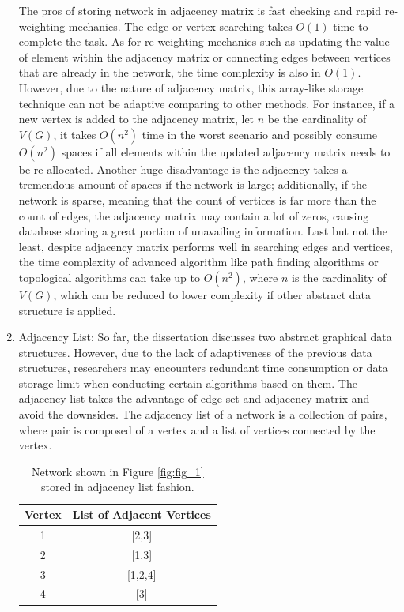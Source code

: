 \documentclass[12pt]{article}
\begin{document}
\begin{enumerate}[label=(\roman*)]
\bigbreak

The pros of storing network in adjacency matrix is fast checking and rapid re-weighting mechanics. The edge or vertex searching takes $O(1)$ time to complete the task. As for re-weighting mechanics such as updating the value of element within the adjacency matrix or connecting edges between vertices that are already in the network, the time complexity is also in $O(1)$. However, due to the nature of adjacency matrix, this array-like storage technique can not be adaptive comparing to other methods. For instance, if a new vertex is added to the adjacency matrix, let $n$ be the cardinality of $V(G)$, it takes $O(n^2)$ time in the worst scenario and possibly consume $O(n^2)$ spaces if all elements within the updated adjacency matrix needs to be re-allocated. Another huge disadvantage is the adjacency takes a tremendous amount of spaces if the network is large; additionally, if the network is sparse, meaning that the count of vertices is far more than the count of edges, the adjacency matrix may contain a lot of zeros, causing database storing a great portion of unavailing information. Last but not the least, despite adjacency matrix performs well in searching edges and vertices, the time complexity of advanced algorithm like path finding algorithms or topological algorithms can take up to $O(n^2)$, where $n$ is the cardinality of $V(G)$, which can be reduced to lower complexity if other abstract data structure is applied\cite{16}.

\item Adjacency List: So far, the dissertation discusses two abstract graphical data structures. However, due to the lack of adaptiveness of the previous data structures, researchers may encounters redundant time consumption or data storage limit when conducting certain algorithms based on them. The adjacency list takes the advantage of edge set and adjacency matrix and avoid the downsides. The adjacency list of a network is a collection of pairs, where pair is composed of a vertex and a list of vertices connected by the vertex. 


\begin{table}
    \begin{center}
        \begin{tabular}{ |c|c| } 
            \hline
            Vertex & List of Adjacent Vertices\\ 
            \hline\hline
            1 & [2,3] \\ 
            \hline
            2 & [1,3] \\ 
            \hline
            3 & [1,2,4]\\
            \hline
            4 & [3] \\
            \hline
        \end{tabular}
        \caption{\label{tab:adj_list} Network shown in Figure \ref{fig:fig_1} stored in adjacency list fashion.}
    \end{center}
\end{table}


\end{enumerate}
\end{document}
